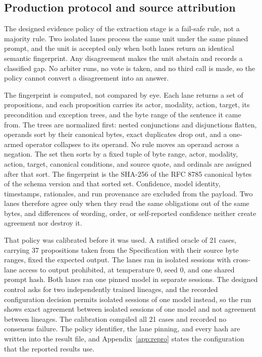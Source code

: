 \subsection{Production protocol and source attribution}

The designed evidence policy of the extraction stage is a fail-safe rule, not a majority rule. Two isolated lanes process the same unit under the same pinned prompt, and the unit is accepted only when both lanes return an identical semantic fingerprint. Any disagreement makes the unit abstain and records a classified gap. No arbiter runs, no vote is taken, and no third call is made, so the policy cannot convert a disagreement into an answer.

The fingerprint is computed, not compared by eye. Each lane returns a set of propositions, and each proposition carries its actor, modality, action, target, its precondition and exception trees, and the byte range of the sentence it came from. The trees are normalized first: nested conjunctions and disjunctions flatten, operands sort by their canonical bytes, exact duplicates drop out, and a one-armed operator collapses to its operand. No rule moves an operand across a negation. The set then sorts by a fixed tuple of byte range, actor, modality, action, target, canonical conditions, and source quote, and ordinals are assigned after that sort. The fingerprint is the SHA-256 of the RFC 8785 canonical bytes of the schema version and that sorted set. Confidence, model identity, timestamps, rationales, and run provenance are excluded from the payload. Two lanes therefore agree only when they read the same obligations out of the same bytes, and differences of wording, order, or self-reported confidence neither create agreement nor destroy it.

That policy was calibrated before it was used. A ratified oracle of 21 cases, carrying 37 propositions taken from the Specification with their source byte ranges, fixed the expected output. The lanes ran in isolated sessions with cross-lane access to output prohibited, at temperature 0, seed 0, and one shared prompt hash. Both lanes ran one pinned model in separate sessions. The designed control asks for two independently trained lineages, and the recorded configuration decision permits isolated sessions of one model instead, so the run shows exact agreement between isolated sessions of one model and not agreement between lineages. The calibration compiled all 21 cases and recorded no consensus failure. The policy identifier, the lane pinning, and every hash are written into the result file, and Appendix~\ref{app:repro} states the configuration that the reported results use.

